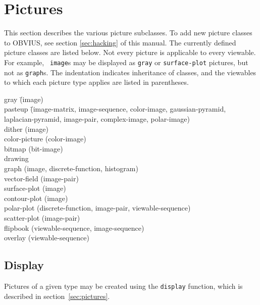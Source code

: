 \section{Pictures}

This section describes the various picture subclasses.  To add new
picture classes to OBVIUS, see section \ref{sec:hacking} of this
manual.  The currently defined picture classes are listed below.  Not
every picture is applicable to every viewable.  For example, {\tt
image}s may be displayed as {\tt gray} or {\tt surface-plot} pictures,
but not as {\tt graph}s.  The indentation indicates inheritance of
classes, and the viewables to which each picture type applies are
listed in parentheses.
\begin{tabbing}
gray \= (image) \\ 
\> pasteup \= (image-matrix, image-sequence, color-image, gaussian-pyramid, \\
\> \> laplacian-pyramid, image-pair, complex-image, polar-image) \\
\> dither (image) \\
color-picture (color-image) \\
bitmap (bit-image) \\
drawing \\
\> graph (image, discrete-function, histogram) \\
\> vector-field (image-pair) \\
\> surface-plot (image) \\
\> contour-plot (image) \\
\> polar-plot (discrete-function, image-pair, viewable-sequence) \\
\> scatter-plot (image-pair) \\
flipbook (viewable-sequence, image-sequence) \\
overlay (viewable-sequence) \\
\end{tabbing} 


\subsection{Display}
\label{sec:display}

Pictures of a given type may be created using the {\tt display}
function, which is described in section~\ref{sec:pictures}.

